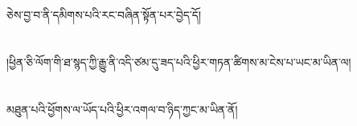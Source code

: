 ཅེས་བྱ་བ་ནི་དམིགས་པའི་རང་བཞིན་སྟོན་པར་བྱེད་དོ།\chapter{ }།ཕྱིན་ཅི་ལོག་གི་ཐ་སྙད་ཀྱི་རྒྱུ་ནི་འདི་ཙམ་དུ་ཟད་པའི་ཕྱིར་གཏན་ཚིགས་མ་ངེས་པ་ཡང་མ་ཡིན་ལ།\chapter{ }མཐུན་པའི་ཕྱོགས་ལ་ཡོད་པའི་ཕྱིར་འགལ་བ་ཉིད་ཀྱང་མ་ཡིན་ནོ།\chapter{ }